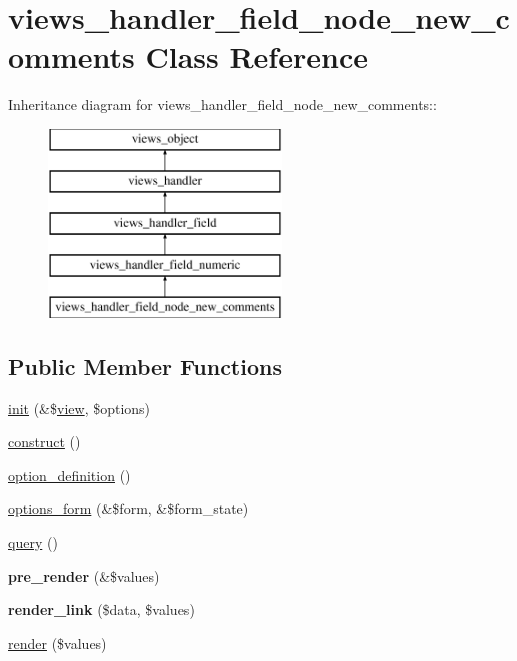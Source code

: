 \hypertarget{classviews__handler__field__node__new__comments}{
\section{views\_\-handler\_\-field\_\-node\_\-new\_\-comments Class Reference}
\label{classviews__handler__field__node__new__comments}
}
Inheritance diagram for views\_\-handler\_\-field\_\-node\_\-new\_\-comments::\begin{figure}[H]
\begin{center}
\leavevmode
\includegraphics[height=5cm]{classviews__handler__field__node__new__comments}
\end{center}
\end{figure}
\subsection*{Public Member Functions}
\begin{CompactItemize}
\item 
\hyperlink{classviews__handler__field__node__new__comments_8f93300640b88efd9401dc2666fcc64a}{init} (\&\$\hyperlink{classview}{view}, \$options)
\item 
\hyperlink{classviews__handler__field__node__new__comments_a496a5184a390c29a60e0dc7d16c23e5}{construct} ()
\item 
\hyperlink{classviews__handler__field__node__new__comments_eea2f5790d310ddcaba82c05593e82e7}{option\_\-definition} ()
\item 
\hyperlink{classviews__handler__field__node__new__comments_2a209d3acbaa47e781df96bc0ca85156}{options\_\-form} (\&\$form, \&\$form\_\-state)
\item 
\hyperlink{classviews__handler__field__node__new__comments_b49cfad0c25d081f0ee70e2e0d0db809}{query} ()
\item 
\hypertarget{classviews__handler__field__node__new__comments_a5442b95bd06e86ca293e30ae4ca96bb}{
\textbf{pre\_\-render} (\&\$values)}
\label{classviews__handler__field__node__new__comments_a5442b95bd06e86ca293e30ae4ca96bb}

\item 
\hypertarget{classviews__handler__field__node__new__comments_b8eb504af9ca179f32c2abeb4582bf75}{
\textbf{render\_\-link} (\$data, \$values)}
\label{classviews__handler__field__node__new__comments_b8eb504af9ca179f32c2abeb4582bf75}

\item 
\hyperlink{classviews__handler__field__node__new__comments_6b1e79531ba28eb32e71c7ff2129e82d}{render} (\$values)
\end{CompactItemize}


